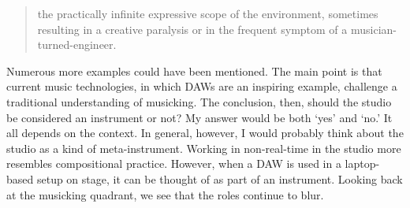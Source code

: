 \begin{quote}
 the practically infinite expressive scope of the environment, sometimes resulting in a creative paralysis or in the frequent symptom of a musician-turned-engineer.
\end{quote}

Numerous more examples could have been mentioned. The main point is that current music technologies, in which DAWs are an inspiring example, challenge a traditional understanding of musicking. The conclusion, then, should the studio be considered an instrument or not? My answer would be both `yes' and `no.' It all depends on the context. In general, however, I would probably think about the studio as a kind of meta-instrument. Working in non-real-time in the studio more resembles compositional practice. However, when a DAW is used in a laptop-based setup on stage, it can be thought of as part of an instrument. Looking back at the musicking quadrant, we see that the roles continue to blur.
